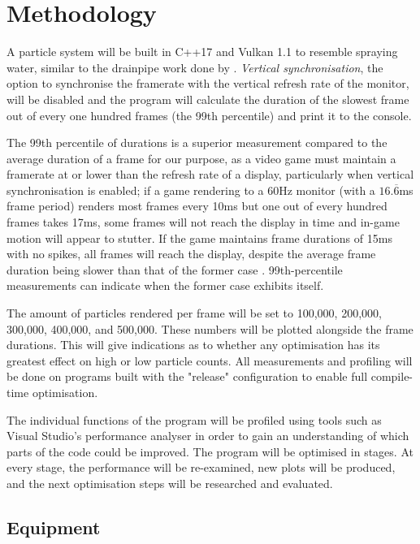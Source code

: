 \documentclass[11pt, a4paper, twocolumn]{article}
\begin{document}
\section{Methodology}

A particle system will be built in C++17 and Vulkan 1.1 to resemble spraying water, similar to the drainpipe work done by \citet{Tatarchuk2006}. \emph{Vertical synchronisation}, the option to synchronise the framerate with the vertical refresh rate of the monitor, will be disabled and the program will calculate the duration of the slowest frame out of every one hundred frames (the 99th percentile) and print it to the console.

The 99th percentile of durations is a superior measurement compared to the average duration of a frame for our purpose, as a video game must maintain a framerate at or lower than the refresh rate of a display, particularly when vertical synchronisation is enabled; if a game rendering to a 60Hz monitor (with a $16.\overline{6}$ms frame period) renders most frames every 10ms but one out of every hundred frames takes 17ms, some frames will not reach the display in time and in-game motion will appear to stutter. If the game maintains frame durations of 15ms with no spikes, all frames will reach the display, despite the average frame duration being slower than that of the former case \citep{IntelFrameTime}. 99th-percentile measurements can indicate when the former case exhibits itself.

The amount of particles rendered per frame will be set to 100,000, 200,000, 300,000, 400,000, and 500,000. These numbers will be plotted alongside the frame durations. This will give indications as to whether any optimisation has its greatest effect on high or low particle counts. All measurements and profiling will be done on programs built with the "release" configuration to enable full compile-time optimisation.

The individual functions of the program will be profiled using tools such as Visual Studio's performance analyser \citep{VSPerfTools} in order to gain an understanding of which parts of the code could be improved. The program will be optimised in stages. At every stage, the performance will be re-examined, new plots will be produced, and the next optimisation steps will be researched and evaluated.

\subsection{Equipment}
\end{document}
